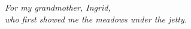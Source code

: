 \thispagestyle{empty}
\vspace*{0.3\textheight}
\begin{center}\itshape
  For my grandmother, Ingrid,\\
  who first showed me the meadows under the jetty.
\end{center}
\cleardoublepage
